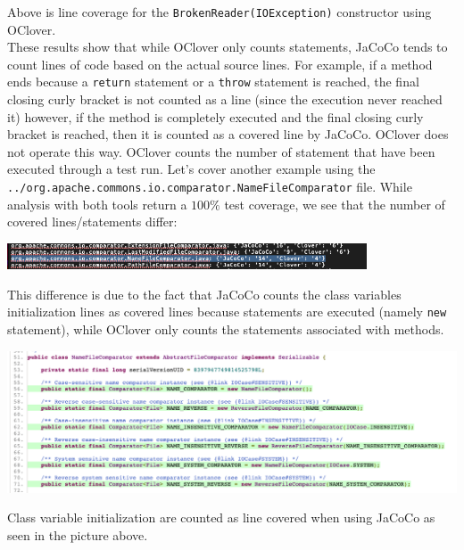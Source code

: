 \begin{enumerate}[label={\alph*)}]
\begin{center}
    \end{center}
    \noindent Above is line coverage for the \verb|BrokenReader(IOException)| constructor using OClover.\\
    \noindent These results show that while OClover only counts statements, JaCoCo tends to count lines of code based on the actual source lines. For example, if a method ends because a \verb|return| statement or a \verb|throw| statement is reached, the final closing curly bracket is not counted as a line (since the execution never reached it) however, if the method is completely executed and the final closing curly bracket is reached, then it is counted as a covered line by JaCoCo. OClover does not operate this way. OClover counts the number of statement that have been executed through a test run.
    \noindent Let's cover another example using the \verb|../org.apache.commons.io.comparator.NameFileComparator| file. While analysis with both tools return a $100\%$ test coverage, we see that the number of covered lines/statements differ:
    \begin{center}
        \includegraphics[width=0.8\textwidth]{img/mani.png}
    \end{center}
    
    \noindent This difference is due to the fact that JaCoCo counts the class variables initialization lines as covered lines because statements are executed (namely \verb|new| statement), while OClover only counts the statements associated with methods. 
    
    \begin{center}
        \includegraphics[width=1.1\textwidth]{img/fieldJ.png}
    \end{center}
    \noindent Class variable initialization are counted as line covered when using JaCoCo as seen in the picture above. 
    

\end{enumerate}
